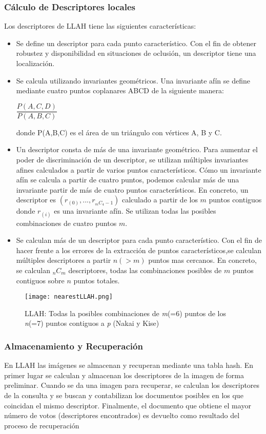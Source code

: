 \subsubsection{Cálculo de Descriptores locales}
Los descriptores de LLAH tiene las siguientes características:
\begin{itemize}
\item Se define un descriptor para cada punto característico. Con el fin de obtener robustez y disponibilidad en situaciones de oclusión, un descriptor tiene una localización.
\item Se calcula utilizando invariantes geométricos. Una invariante afín se define mediante cuatro puntos coplanares ABCD de la siguiente manera:
  \begin{center}
    $ \dfrac{P(A,C,D)}{P(A,B,C)} $
  \end{center}
  donde P(A,B,C) es el área de un triángulo con vértices A, B y C.
\item Un descriptor consta de más de una invariante geométrico. Para aumentar el poder de discriminación de un descriptor, se utilizan múltiples invariantes afines calculados a partir de varios puntos característicos. Cómo un invariante afín se calcula a partir de cuatro puntos, podemos calcular más de una invariante partir de más de cuatro puntos característicos. En concreto, un descriptor es $(r_{(0)},...,r_{_{m}C_{4}-1})$ calculado a partir de los $m$ puntos contiguos donde $r_{(i)}$ es una invariante afín. Se utilizan todas las posibles combinaciones de cuatro puntos $m$.
\item Se calculan más de un descriptor para cada punto característico. Con el fin de hacer frente a los errores de la extracción de puntos característicos,se calculan múltiples descriptores a partir $n (>m)$ puntos mas cercanos. En concreto, se calculan $_{n}C_{m}$ descriptores, todas las combinaciones posibles de $m$ puntos contiguos sobre $n$ puntos totales.
\end{itemize} 

\begin{figure}
  \centering
  \texttt{[image: nearestLLAH.png]}
  \caption{LLAH: Todas la posibles combinaciones de \textit{m}(=6) puntos de los \textit{n}(=7) puntos contiguos a \textit{p} (Nakai y Kise)}
  \label{fig:nearest}
\end{figure}

\subsubsection{Almacenamiento y Recuperación}
En LLAH las imágenes se almacenan y recuperan mediante una tabla hash. En primer lugar se calculan y almacenan los descriptores de la imagen de forma preliminar. Cuando se da una imagen para recuperar, se calculan los descriptores de la consulta y se buscan y contabilizan los documentos posibles en los que coincidan el mismo descriptor. Finalmente, el documento que obtiene el mayor número de votos (descriptores encontrados)  es devuelto como resultado del proceso de recuperación


